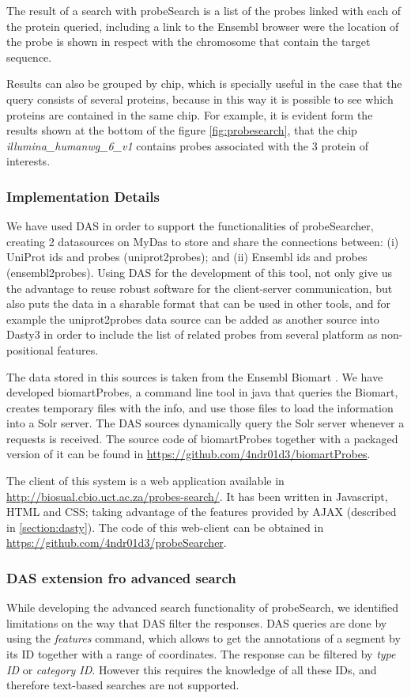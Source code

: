 The result of a search with probeSearch is a list of the probes linked with each of the protein queried, including a link to the Ensembl browser were the location of the probe is shown in respect with the chromosome that contain the target sequence.

Results can also be grouped by chip, which is specially useful in the case that the query consists of several proteins, because in this way it is possible to see which proteins are contained in the same chip. For example, it is evident form the results shown at the bottom of the figure \ref{fig:probesearch}, 
that the chip \emph{illumina\_humanwg\_6\_v1} contains probes associated with the 3 protein of interests.
 
\subsubsection{Implementation Details}
We have used DAS in order to support the functionalities of probeSearcher, creating 2 datasources on MyDas to store and share the connections between: (i)   UniProt ids and probes (uniprot2probes); and (ii) Ensembl ids and probes (ensembl2probes). Using DAS for the development of this tool, not only give us the advantage to reuse robust software for the client-server communication, but also puts the data in a sharable format that can be used in other tools, and for example the uniprot2probes data source can be added as another source into Dasty3 in order to include the list of related probes from several platform as non-positional features.

The data stored in this sources is taken from the Ensembl Biomart \cite{KIN2011}. We have developed biomartProbes, a command line tool in java that queries the Biomart, creates temporary files with the info, and use those files to load the information into a Solr server. The DAS sources dynamically query the Solr server whenever a requests is received. The source code of biomartProbes together with a packaged version of it can be found in \url{https://github.com/4ndr01d3/biomartProbes}.

The client of this system is a web application available in \url{http://biosual.cbio.uct.ac.za/probes-search/}. It has been written in Javascript, HTML and CSS; taking advantage of the features provided by AJAX (described in \ref{section:dasty}). The code of this web-client can be obtained in \url{https://github.com/4ndr01d3/probeSearcher}.

\subsubsection{DAS extension fro advanced search}
While developing the advanced search functionality of probeSearch, we identified limitations on the way that DAS filter the responses. DAS queries are done by using the \emph{features} command, which allows to get the annotations of a segment by its ID together with a range of coordinates. The response can be filtered by \emph{type ID} or \emph{category ID}. However this requires the knowledge of all these IDs, and therefore text-based searches are not supported.

